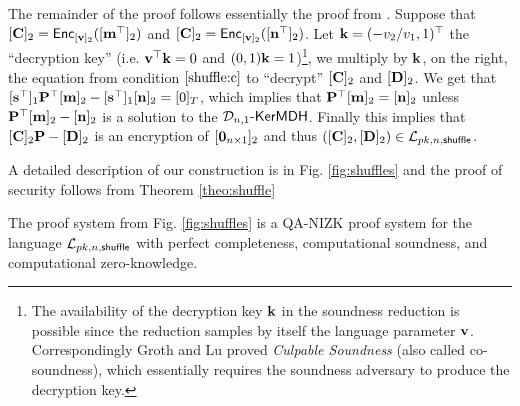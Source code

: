 The remainder of the proof follows essentially the proof from \cite{AC:GroLu07}. Suppose that $[\mathbf{{C}}]_2=\mathsf{Enc}_{[\mathbf{v}]_2}([\mathbf{{m}}^\top]_2)$ and $[\mathbf{{C}}]_2=\mathsf{Enc}_{[\mathbf{v}]_2}([\mathbf{{n}}^\top]_2)$. Let $\mathbf{k}=(-v_2/v_1,1)^\top$ the ``decryption key'' (i.e. $\mathbf{v}^\top\mathbf{k}=0$ and $(0,1)\mathbf{k}=1$)\footnote{The availability of the decryption key $\mathbf{k}$ in the soundness reduction is possible since the reduction samples by itself the language parameter $\mathbf{v}$. Correspondingly Groth and Lu \cite{AC:GroLu07} proved \emph{Culpable Soundness} (also called co-soundness), which essentially requires the soundness adversary to produce the decryption key.}, we multiply by $\mathbf{{k}}$, on the right, the equation from condition $\ref{shuffle:c}$ to ``decrypt'' $[\mathbf{{C}}]_2$ and $[\mathbf{{D}}]_2$. We get that
$[\mathbf{s}^\top]_1\mathbf{{P}}^\top[\mathbf{{m}}]_2-[\mathbf{s}^\top]_1[\mathbf{{n}}]_2=[0]_T$, which implies that $\mathbf{{P}}^\top[\mathbf{{m}}]_2=[\mathbf{{n}}]_2$ unless $\mathbf{{P}}^\top[\mathbf{{m}}]_2-[\mathbf{{n}}]_2$ is a solution to the $\mathcal{D}_{n,1}\mbox{-}\mathsf{KerMDH}$. Finally this implies that $[\mathbf{{C}}]_2\mathbf{{P}}-[\mathbf{{D}}]_2$ is an encryption of $[\mathbf{{0}}_{n\times 1}]_2$ and thus $([\mathbf{{C}}]_2,[\mathbf{{D}}]_2)\in\mathcal{L}_{pk,n,\mathsf{shuffle}}$.

A detailed description of our construction is in Fig. \ref{fig:shuffles} and the proof of security follows from Theorem \ref{theo:shuffle}


\begin{theorem} \label{theo:shuffle}
The proof system from Fig. \ref{fig:shuffles} is a QA-NIZK proof system for the language $\mathcal{L}_{pk,n,\mathsf{shuffle}}$ with perfect completeness, computational soundness, and computational zero-knowledge.
\end{theorem}

